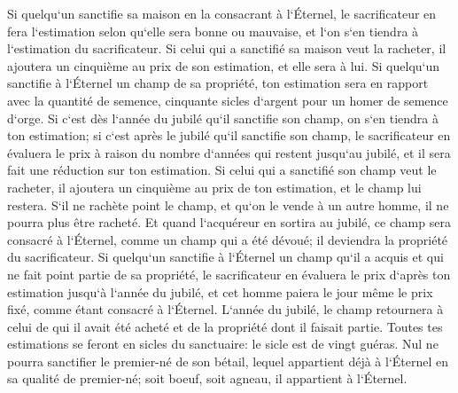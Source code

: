 \verse Si quelqu`un sanctifie sa maison en la consacrant à l`Éternel, le sacrificateur en fera l`estimation selon qu`elle sera bonne ou mauvaise, et l`on s`en tiendra à l`estimation du sacrificateur. 
\verse Si celui qui a sanctifié sa maison veut la racheter, il ajoutera un cinquième au prix de son estimation, et elle sera à lui. 
\verse Si quelqu`un sanctifie à l`Éternel un champ de sa propriété, ton estimation sera en rapport avec la quantité de semence, cinquante sicles d`argent pour un homer de semence d`orge. 
\verse Si c`est dès l`année du jubilé qu`il sanctifie son champ, on s`en tiendra à ton estimation; 
\verse si c`est après le jubilé qu`il sanctifie son champ, le sacrificateur en évaluera le prix à raison du nombre d`années qui restent jusqu`au jubilé, et il sera fait une réduction sur ton estimation. 
\verse Si celui qui a sanctifié son champ veut le racheter, il ajoutera un cinquième au prix de ton estimation, et le champ lui restera. 
\verse S`il ne rachète point le champ, et qu`on le vende à un autre homme, il ne pourra plus être racheté. 
\verse Et quand l`acquéreur en sortira au jubilé, ce champ sera consacré à l`Éternel, comme un champ qui a été dévoué; il deviendra la propriété du sacrificateur. 
\verse Si quelqu`un sanctifie à l`Éternel un champ qu`il a acquis et qui ne fait point partie de sa propriété, 
\verse le sacrificateur en évaluera le prix d`après ton estimation jusqu`à l`année du jubilé, et cet homme paiera le jour même le prix fixé, comme étant consacré à l`Éternel. 
\verse L`année du jubilé, le champ retournera à celui de qui il avait été acheté et de la propriété dont il faisait partie. 
\verse Toutes tes estimations se feront en sicles du sanctuaire: le sicle est de vingt guéras. 
\verse Nul ne pourra sanctifier le premier-né de son bétail, lequel appartient déjà à l`Éternel en sa qualité de premier-né; soit boeuf, soit agneau, il appartient à l`Éternel. 
